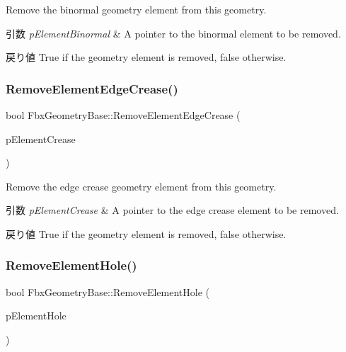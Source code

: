 Remove the binormal geometry element from this geometry. 
\begin{DoxyParams}{引数}
{\em p\+Element\+Binormal} & A pointer to the binormal element to be removed. \\
\hline
\end{DoxyParams}
\begin{DoxyReturn}{戻り値}
{\ttfamily True} if the geometry element is removed, {\ttfamily false} otherwise. 
\end{DoxyReturn}
\mbox{\label{class_fbx_geometry_base_a91216359c824cc80d113e0760d59e9bb}} 
\subsubsection{\texorpdfstring{Remove\+Element\+Edge\+Crease()}{RemoveElementEdgeCrease()}}
{\footnotesize\ttfamily bool Fbx\+Geometry\+Base\+::\+Remove\+Element\+Edge\+Crease (\begin{DoxyParamCaption}\item[{\hyperlink{fbxlayer_8h_aa1db71d39153856548f192cf52aa2cc5}{Fbx\+Geometry\+Element\+Crease} $\ast$}]{p\+Element\+Crease }\end{DoxyParamCaption})}

Remove the edge crease geometry element from this geometry. 
\begin{DoxyParams}{引数}
{\em p\+Element\+Crease} & A pointer to the edge crease element to be removed. \\
\hline
\end{DoxyParams}
\begin{DoxyReturn}{戻り値}
{\ttfamily True} if the geometry element is removed, {\ttfamily false} otherwise. 
\end{DoxyReturn}
\mbox{\label{class_fbx_geometry_base_a26484bbcc3f5a76366fcbe7352c8fefa}} 
\subsubsection{\texorpdfstring{Remove\+Element\+Hole()}{RemoveElementHole()}}
{\footnotesize\ttfamily bool Fbx\+Geometry\+Base\+::\+Remove\+Element\+Hole (\begin{DoxyParamCaption}\item[{\hyperlink{fbxlayer_8h_ac66f768aa149c016447f88213c374e25}{Fbx\+Geometry\+Element\+Hole} $\ast$}]{p\+Element\+Hole }\end{DoxyParamCaption})}

